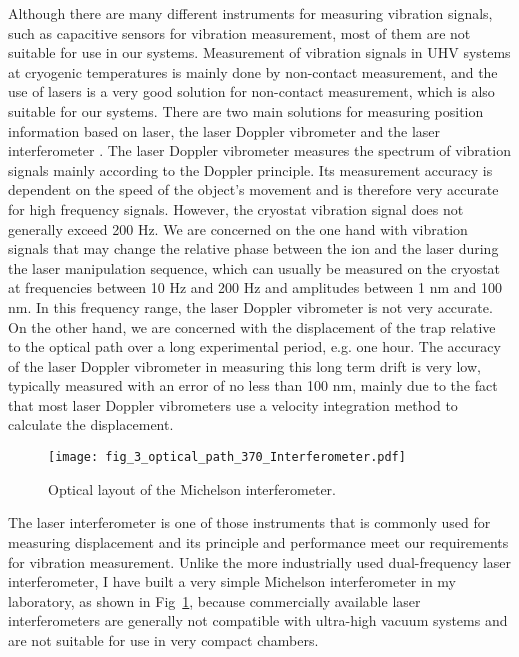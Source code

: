 Although there are many different instruments for measuring vibration signals, such as capacitive sensors for vibration measurement, most of them are not suitable for use in our systems. Measurement of vibration signals in UHV systems at cryogenic temperatures is mainly done by non-contact measurement, and the use of lasers is a very good solution for non-contact measurement, which is also suitable for our systems. There are two main solutions for measuring position information based on laser, the laser Doppler vibrometer and the laser interferometer \cite{RN295}. The laser Doppler vibrometer measures the spectrum of vibration signals mainly according to the Doppler principle. Its measurement accuracy is dependent on the speed of the object's movement and is therefore very accurate for high frequency signals. However, the cryostat vibration signal does not generally exceed 200 Hz. We are concerned on the one hand with vibration signals that may change the relative phase between the ion and the laser during the laser manipulation sequence, which can usually be measured on the cryostat at frequencies between 10 Hz and 200 Hz and amplitudes between 1 nm and 100 nm. In this frequency range, the laser Doppler vibrometer is not very accurate. On the other hand, we are concerned with the displacement of the trap relative to the optical path over a long experimental period, e.g. one hour. The accuracy of the laser Doppler vibrometer in measuring this long term drift is very low, typically measured with an error of no less than 100 nm, mainly due to the fact that most laser Doppler vibrometers use a velocity integration method to calculate the displacement.

\begin{figure}
    \centering
    \texttt{[image: fig\_3\_optical\_path\_370\_Interferometer.pdf]}
    \caption{Optical layout of the Michelson interferometer.}
    \label{fig:fig_3_optical_path_370_Interferometer}
\end{figure}

The laser interferometer is one of those instruments that is commonly used for measuring displacement and its principle and performance meet our requirements for vibration measurement. Unlike the more industrially used dual-frequency laser interferometer, I have built a very simple Michelson interferometer in my laboratory, as shown in Fig~\ref{fig:fig_3_optical_path_370_Interferometer}, because commercially available laser interferometers are generally not compatible with ultra-high vacuum systems and are not suitable for use in very compact chambers.

